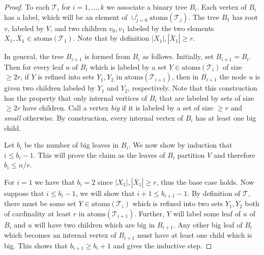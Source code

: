 \documentclass[10pt,a4paper]{article}
\newcommand{\Tcal}{\mathcal{T}}
\newcommand{\atoms}{\mathrm{atoms}}
\newcommand{\1}{\mathbf{1}}
\theoremstyle{definition}
\begin{document}
\begin{proof}
To each $\Tcal_i$ for $i = 1, \ldots, k$ we associate a binary tree $B_i$.  Each vertex of $B_i$ has a label, which will be an element of $\cup_{j=0}^i \atoms(\Tcal_j)$.  
The tree $B_1$ has root $v$, labeled by $V$, and two children $v_0, v_1$ labeled by the two elements $X_1, \overline{X}_1 \in \atoms(\Tcal_1)$.  Note that by definition 
$|X_1|, |\overline{X}_1| \ge r$.  

In general, the tree $B_{i+1}$ is formed from $B_i$ as follows.  Initially, set $B_{i+1}=B_i$.  Then for every leaf $u$ of $B_i$ which is labeled by a set $Y \in \atoms(\Tcal_i)$ of size $\ge 2r$, 
if $Y$ is refined into sets $Y_1, Y_2$ in $\atoms(\Tcal_{i+1})$, then in $B_{i+1}$ the node $u$ is given two children labeled by $Y_1$ and $Y_2$, respectively.  Note that this construction 
has the property that only internal vertices of $B_i$ that are labeled by sets of size $\ge 2r$ have children.  Call a vertex \emph{big} if it is labeled by a set of size $\ge r$ and \emph{small} 
otherwise.  By construction, every internal vertex of $B_i$ has at least one big child.

Let $b_i$ be the number of big leaves in $B_i$.  We now show by induction that $i \le b_i - 1$.  This will prove the claim as the leaves of $B_i$ partition $V$ and therefore 
$b_i \le n/r$.  

For $i=1$ we have that $b_i = 2$ since $|X_1|, |\overline{X}_1| \ge r$, thus the base case holds.  Now suppose that $i \le b_i-1$, we will show that $i+1 \le b_{i+1}-1$.  
By definition of $\Tcal$, there must be some set $Y \in \atoms(\Tcal_i)$ which is refined into two sets $Y_1, Y_2$ both of cardinality at least $r$ in $\atoms(\Tcal_{i+1})$.  
Further, $Y$ will label some leaf of $u$ of $B_i$ and $u$ will have two children which are big in $B_{i+1}$.  Any other big leaf of $B_i$ which becomes an internal vertex 
of $B_{i+1}$ must have at least one child which is big.  This shows that $b_{i+1} \ge b_i + 1$ and gives the inductive step.
\end{proof}
\end{document}
